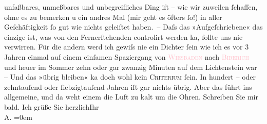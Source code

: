                     unfaßbares, unmeßbares und unbegreifliches Ding iſt – wie wir zuweilen ſchaffen,
                    ohne es zu bemerken u ein andres Mal (mir geht es öfters ſo!) in aller
                    Geſchäftigkeit ſo gut wie nichts geleiſtet haben. – Daſs das »Aufgeſchriebene«
                    das einzige ist, was von den Fernerſtehenden controlirt werden ka{\geminationn}, ſollte uns nie verwirren. Für die {\pb}andern werd ich gewiſs nie ein Dichter ſein wie ich
                    es vor 3 Jahren einmal auf einem einſamen Spaziergang von \textsc{\textcolor{pink}{Wiesbaden}{}\ledrightnote{\textcolor{pink}{Wiesbaden}}} nach \textcolor{pink}{\textsc{Biberich}}{}\ledrightnote{\textcolor{pink}{Biebrich}} und heuer im Sommer zehn oder gar zwanzig Minuten auf dem Lichtenstein war – Und das »übrig bleiben« ka{\geminationn} doch wohl kein \textsc{Criterium}{ }ſein. In hundert – oder zehntauſend oder
                    ſiebzigtauſend Jahren iſt gar nichts {\pb}übrig.\pend
           \pstart
           Aber das führt ins allgemeine, und da weht einem die Luft zu kalt um die
                    Ohren.\pend
           \pstart
           Schreiben Sie mir bald. Ich grüße Sie herzlich\hspace*{1.5em}Ihr{\\[\baselineskip]}\spacefill\mbox{A.}\pend
           \leftskip=0em{}\endnumbering{}  
      
